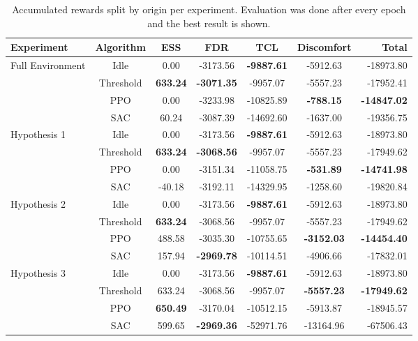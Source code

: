 \begin{table}[t]
\caption{Accumulated rewards split by origin per experiment. Evaluation was done after every epoch and the best result is shown.}
\label{tab:experiments}
\vskip 0.15in
\begin{center}
\begin{small}
\begin{sc}
\begin{tabular}{lcccccr}
\toprule
Experiment & Algorithm & ESS & FDR & TCL & Discomfort & Total \\
\midrule
\multirow{4}{*}{Full Environment} 
    & Idle      & 0.00   & -3173.56 & \textbf{-9887.61}  & -5912.63 & -18973.80 \\
    & Threshold & \textbf{633.24} & \textbf{-3071.35} & -9957.07  & -5557.23 & -17952.41 \\
    & PPO       & 0.00   & -3233.98 & -10825.89 & \textbf{-788.15} & \textbf{-14847.02} \\
    & SAC       & 60.24  & -3087.39 & -14692.60 & -1637.00 & -19356.75 \\
\midrule
\multirow{4}{*}{Hypothesis 1}
    & Idle      & 0.00   & -3173.56 & \textbf{-9887.61} & -5912.63 & -18973.80 \\
    & Threshold & \textbf{633.24} & \textbf{-3068.56} & -9957.07 & -5557.23 & -17949.62 \\
    & PPO       & 0.00   & -3151.34 & -11058.75& \textbf{-531.89} & \textbf{-14741.98} \\
    & SAC       & -40.18 & -3192.11 & -14329.95 & -1258.60 & -19820.84 \\
\midrule
\multirow{4}{*}{Hypothesis 2} 
    & Idle      & 0.00   & -3173.56 & \textbf{-9887.61} & -5912.63 & -18973.80 \\
    & Threshold & \textbf{633.24} & -3068.56 & -9957.07 & -5557.23 & -17949.62 \\
    & PPO       & 488.58 & -3035.30 & -10755.65 & \textbf{-3152.03} & \textbf{-14454.40} \\
    & SAC       & 157.94 & \textbf{-2969.78} & -10114.51 & -4906.66 & -17832.01 \\
\midrule
\multirow{4}{*}{Hypothesis 3} 
    & Idle      & 0.00   & -3173.56 & \textbf{-9887.61} & -5912.63 & -18973.80 \\
    & Threshold & 633.24 & -3068.56 & -9957.07 & \textbf{-5557.23} & \textbf{-17949.62} \\
    & PPO       & \textbf{650.49} & -3170.04 & -10512.15 & -5913.87 & -18945.57 \\
    & SAC       & 599.65 & \textbf{-2969.36} & -52971.76 & -13164.96 & -67506.43 \\
\bottomrule
\end{tabular}
\end{sc}
\end{small}
\end{center}
\vskip -0.1in
\end{table}

